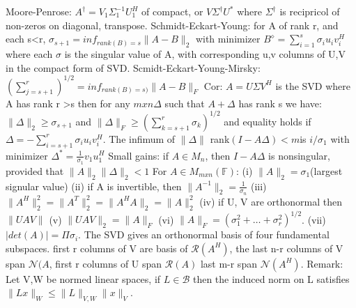 \documentclass[8pt]{extarticle}
\theoremstyle{definition}
\begin{document}
{Moore-Penrose: $A^\dagger = V_1 \Sigma^{-1}_1 U_1^H$ of compact, or $V\Sigma^\dagger U^*$ where $\Sigma^\dagger$ is recipricol of non-zeros on diagonal, transpose. 
Schmidt-Eckart-Young: for A of rank r, and each s<r, $\sigma_{s+1} = inf_{rank(B) =s}\|A-B\|_2$ 
with minimizer $ B^\diamond = \sum_{i=1}^s \sigma_iu_iv_i^H$ where each $\sigma$ is the singular value of A, with corresponding u,v columns of U,V in the compact form of SVD.
Scmidt-Eckart-Young-Mirsky: $(\sum_{j=s+1}^r)^{1/2} = inf_{rank(B)=s)}\|A-B\|_F $
Cor: $A = U\Sigma V^H$ is the SVD where A has rank r >s then for any $mxn \Delta$ such that $A+\Delta$ has rank s we have: $\|\Delta\|_2 \geq \sigma_{s+1}$ and $\|\Delta\|_F \geq (\sum^r_{k=s+1}\sigma_k)^{1/2}$ and equality holds if $\Delta = -\sum^r_{i=s+1} \sigma_i u_iv_i^H$.
The infimum of $\|\Delta\|$ rank$(I-A\Delta) < m $is $i/\sigma_1$ with minimizer $\Delta^* = \frac{1}{\sigma_1}v_1u_1^H$
Small gains: if $A \in M_n$, then $I-A\Delta$ is nonsingular, provided that $\|A\|_2\|\Delta\|_2 <1$
For $A \in M_{mxn}(\mathbb{F})$: (i) $\|A\|_2 = \sigma_1$(largest signular value) (ii) if A is invertible, then $\|A^{-1}\|_2 = \frac{1}{\sigma_n}$ (iii) $\|A^H\|^2_2 = \|A^T\|^2_2 = \|A^HA\|_2 = \|A\|^2_2 $ (iv) if U, V are orthonormal then $\|UAV\|$ (v) $\|UAV\|_2 = \|A\|_F$ (vi) $\|A\|_F = (\sigma_1^2+\dots+\sigma_r^2)^{1/2}$. (vii) $|det(A)| = \Pi \sigma_i$. 
The SVD gives an orthonormal basis of four fundamental subspaces. first r columns of V are basis of $\mathscr{R}(A^H)$, the last n-r columns of V span $\mathscr{N}(A$, first r columns of U span $\mathscr{R}(A)$ last m-r span $\mathscr{N}(A^H)$. 
Remark: Let V,W be normed linear spaces, if $L \in \mathscr{B}$ then the induced norm on L satisfies $\|Lx\|_W \leq \|L\|_{V,W}\|x\|_V$.

}
\end{document}
